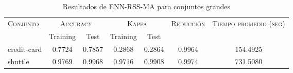 \begin{table}[]
\centering
\begin{tabular}{l c c c c c c}
\hline
\multirow{2}{*}{\textsc{Conjunto}}
	& \multicolumn{2}{c}{\textsc{Accuracy}}
	& \multicolumn{2}{c}{\textsc{Kappa}}
	& \textsc{Reducción}
	& \textsc{Tiempo promedio (seg)} \\
	& Training & Test
	& Training & Test \\ 
\hline
\hline

credit-card & 0.7724 & 0.7857 & 0.2868 & 0.2864 & 0.9964 & 154.4925 \\
shuttle & 0.9769 & 0.9968 & 0.9716 & 0.9908 & 0.9974 & 731.5080 \\

\hline
\end{tabular}
\caption{Resultados de ENN-RSS-MA para conjuntos grandes }
\label{res-grande-ENN-RSS-MA}
\end{table}

\clearpage

